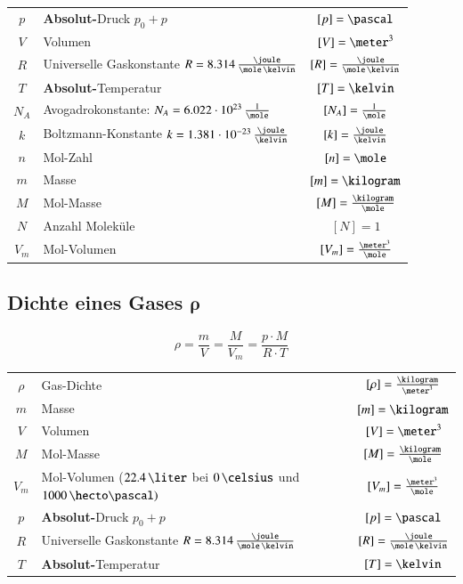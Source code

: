 \renewcommand{\arraystretch}{1.3}
\begin{tabular}{c l c}
	$p$ 	& \textbf{Absolut-}Druck $p_0 + p$ 											& $[p] = \pascal$ 							\\
	$V$ 	& Volumen 																	& $[V] = \meter^3$ 							\\
	$R$		& Universelle Gaskonstante $R = 8.314 \, \frac{\joule}{\mole \, \kelvin}$ 	& $[R] = \frac{\joule}{\mole \, \kelvin}$ 	\\
	$T$ 	& \textbf{Absolut-}Temperatur 												& $[T] = \kelvin$ 							\\
	$N_A$	& Avogadrokonstante: $N_A = 6.022 \cdot 10^{23} \, \frac{1}{\mole}$ 		& $[N_A] = \frac{1}{\mole}$					\\	
	$k$		& Boltzmann-Konstante $k = 1.381 \cdot 10^{-23} \, \frac{\joule}{\kelvin}$ 	& $[k] = \frac{\joule}{\kelvin}$			\\
	$n$ 	& Mol-Zahl 																	& $[n] = \mole$ 							\\
	$m$ 	& Masse 																	& $[m] = \kilogram$ 						\\
	$M$ 	& Mol-Masse 																& $[M] = \frac{\kilogram}{\mole}$			\\
	$N$ 	& Anzahl Moleküle 															& $[N] = 1$ 								\\
	$V_m$ 	& Mol-Volumen 																& $[V_m] = \frac{\meter^3}{\mole}$
\end{tabular}
\renewcommand{\arraystretch}{1}


\subsection[Dichte eines Gases]{Dichte eines Gases $\bm{\rho}$}

\vspace{-0.2cm}

$$ \boxed{ \rho = \frac{m}{V} = \frac{M}{V_m} = \frac{p \cdot M}{R \cdot T} }$$

\renewcommand{\arraystretch}{1.3}
\begin{tabular}{c l c}
	$\rho$ 	& Gas-Dichte 																		& $[\rho] = \frac{\kilogram}{\meter^3}$		\\
	$m$ 	& Masse 																			& $[m] = \kilogram$ 						\\
	$V$ 	& Volumen 																			& $[V] = \meter^3$ 							\\
	$M$ 	& Mol-Masse 																		& $[M] = \frac{\kilogram}{\mole}$			\\
	$V_m$ 	& Mol-Volumen ($22.4 \, \liter$ bei $0 \, \celsius$ und $1000 \, \hecto \pascal)$	& $[V_m] = \frac{\meter^3}{\mole}$ 			\\
	$p$ 	& \textbf{Absolut-}Druck $p_0 + p$ 													& $[p] = \pascal$ 							\\
	$R$		& Universelle Gaskonstante $R = 8.314 \, \frac{\joule}{\mole \, \kelvin}$ 			& $[R] = \frac{\joule}{\mole \, \kelvin}$ 	\\
	$T$ 	& \textbf{Absolut-}Temperatur 														& $[T] = \kelvin$
\end{tabular}
\renewcommand{\arraystretch}{1}

